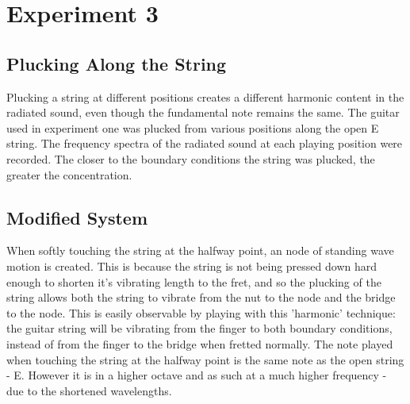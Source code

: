 \documentclass[11pt]{article}
\begin{document}
    \section{Experiment 3}
        \subsection{Plucking Along the String}
            Plucking a string at different positions creates a different harmonic content in the radiated sound, even though the fundamental note remains the same.
            The guitar used in experiment one was plucked from various positions along the open E string.
            The frequency spectra of the radiated sound at each playing position were recorded.
            The closer to the boundary conditions the string was plucked, the greater the concentration.
        \subsection{Modified System}
            When softly touching the string at the halfway point, an node of standing wave motion is created.
            This is because the string is not being pressed down hard enough to shorten it's vibrating length to the fret, and so the plucking of the string allows both the string to vibrate from the nut to the node and the bridge to the node. \cite{PHYS15}
            This is easily observable by playing with this 'harmonic' technique: the guitar string will be vibrating from the finger to both boundary conditions, instead of from the finger to the bridge when fretted normally.
            The note played when touching the string at the halfway point is the same note as the open string - E.
            However it is in a higher octave and as such at a much higher frequency - due to the shortened wavelengths.
\end{document}
